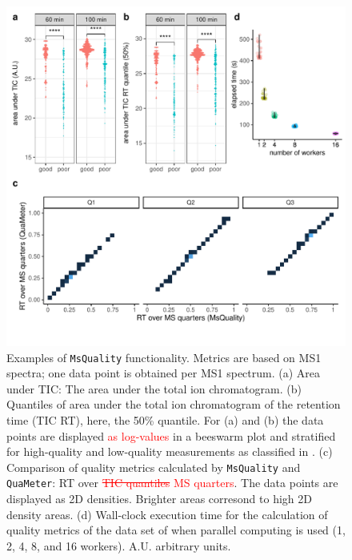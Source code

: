 \documentclass[unnumsec,webpdf,contemporary,large]{oup-authoring-template}%
\theoremstyle{thmstyleone}%
\theoremstyle{thmstyletwo}%
\theoremstyle{thmstylethree}%
\begin{document}
\begin{figure}
    \centering
 	\includegraphics[scale=0.51, clip, trim=0 37 0 5, scale = 0.9]{figure-main}
 	  \caption{Examples of \texttt{MsQuality} functionality. Metrics are based
 	        on MS1 spectra; one data point is obtained per MS1 spectrum.
 	        (a) Area under TIC: The area under the total ion chromatogram. 
            (b) Quantiles of area under the total ion
                chromatogram of the retention time (TIC RT), here, the 50\% quantile. 
  	      For (a) and (b) the data points are displayed \textcolor{red}{as log-values}
                in a beeswarm plot and stratified for high-quality and low-quality
                measurements as classified in \cite{Amidan2014}.
            (c) Comparison of quality metrics calculated by \texttt{MsQuality} 
                and \texttt{QuaMeter}: RT over \textcolor{red}{\sout{TIC quantiles}}
		\textcolor{red}{MS quarters}. The
	      data points are displayed as 2D densities. Brighter areas corresond to
               high 2D density areas.
            (d) Wall-clock execution time for the calculation of quality metrics of the 
                data set of \cite{Amidan2014} when parallel computing is used 
                (1, 2, 4, 8, and 16 workers). A.U. arbitrary units.
    } \label{fig:fig1}
\end{figure}
\end{document}
